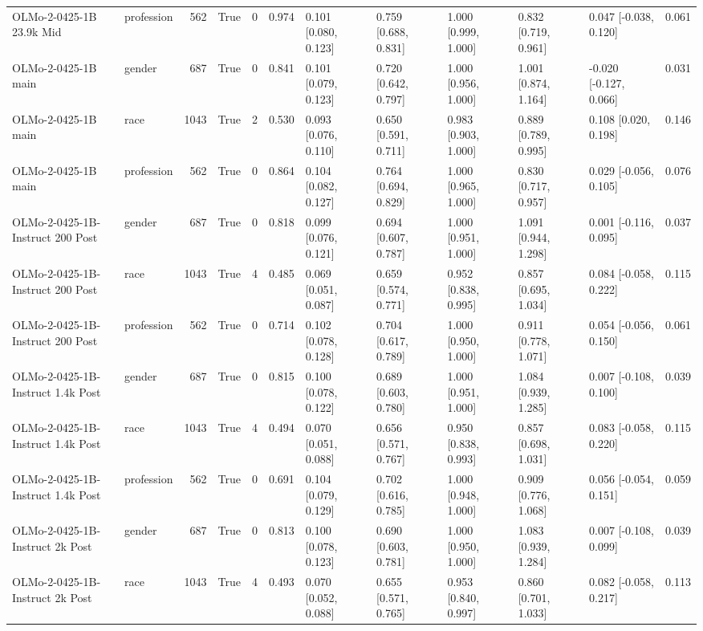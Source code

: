 \begin{tabular}{llrrrrlllllr}
OLMo-2-0425-1B 23.9k Mid & profession & 562 & True & 0 & 0.974 & 0.101 [0.080, 0.123] & 0.759 [0.688, 0.831] & 1.000 [0.999, 1.000] & 0.832 [0.719, 0.961] & 0.047 [-0.038, 0.120] & 0.061 \\
OLMo-2-0425-1B main & gender & 687 & True & 0 & 0.841 & 0.101 [0.079, 0.123] & 0.720 [0.642, 0.797] & 1.000 [0.956, 1.000] & 1.001 [0.874, 1.164] & -0.020 [-0.127, 0.066] & 0.031 \\
OLMo-2-0425-1B main & race & 1043 & True & 2 & 0.530 & 0.093 [0.076, 0.110] & 0.650 [0.591, 0.711] & 0.983 [0.903, 1.000] & 0.889 [0.789, 0.995] & 0.108 [0.020, 0.198] & 0.146 \\
OLMo-2-0425-1B main & profession & 562 & True & 0 & 0.864 & 0.104 [0.082, 0.127] & 0.764 [0.694, 0.829] & 1.000 [0.965, 1.000] & 0.830 [0.717, 0.957] & 0.029 [-0.056, 0.105] & 0.076 \\
OLMo-2-0425-1B-Instruct 200 Post & gender & 687 & True & 0 & 0.818 & 0.099 [0.076, 0.121] & 0.694 [0.607, 0.787] & 1.000 [0.951, 1.000] & 1.091 [0.944, 1.298] & 0.001 [-0.116, 0.095] & 0.037 \\
OLMo-2-0425-1B-Instruct 200 Post & race & 1043 & True & 4 & 0.485 & 0.069 [0.051, 0.087] & 0.659 [0.574, 0.771] & 0.952 [0.838, 0.995] & 0.857 [0.695, 1.034] & 0.084 [-0.058, 0.222] & 0.115 \\
OLMo-2-0425-1B-Instruct 200 Post & profession & 562 & True & 0 & 0.714 & 0.102 [0.078, 0.128] & 0.704 [0.617, 0.789] & 1.000 [0.950, 1.000] & 0.911 [0.778, 1.071] & 0.054 [-0.056, 0.150] & 0.061 \\
OLMo-2-0425-1B-Instruct 1.4k Post & gender & 687 & True & 0 & 0.815 & 0.100 [0.078, 0.122] & 0.689 [0.603, 0.780] & 1.000 [0.951, 1.000] & 1.084 [0.939, 1.285] & 0.007 [-0.108, 0.100] & 0.039 \\
OLMo-2-0425-1B-Instruct 1.4k Post & race & 1043 & True & 4 & 0.494 & 0.070 [0.051, 0.088] & 0.656 [0.571, 0.767] & 0.950 [0.838, 0.993] & 0.857 [0.698, 1.031] & 0.083 [-0.058, 0.220] & 0.115 \\
OLMo-2-0425-1B-Instruct 1.4k Post & profession & 562 & True & 0 & 0.691 & 0.104 [0.079, 0.129] & 0.702 [0.616, 0.785] & 1.000 [0.948, 1.000] & 0.909 [0.776, 1.068] & 0.056 [-0.054, 0.151] & 0.059 \\
OLMo-2-0425-1B-Instruct 2k Post & gender & 687 & True & 0 & 0.813 & 0.100 [0.078, 0.123] & 0.690 [0.603, 0.781] & 1.000 [0.950, 1.000] & 1.083 [0.939, 1.284] & 0.007 [-0.108, 0.099] & 0.039 \\
OLMo-2-0425-1B-Instruct 2k Post & race & 1043 & True & 4 & 0.493 & 0.070 [0.052, 0.088] & 0.655 [0.571, 0.765] & 0.953 [0.840, 0.997] & 0.860 [0.701, 1.033] & 0.082 [-0.058, 0.217] & 0.113 \\

\end{tabular}
